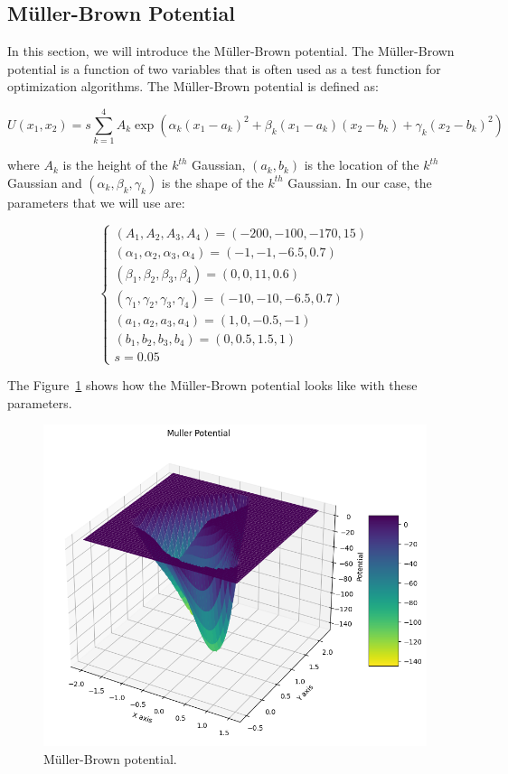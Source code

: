 \documentclass{report}
\begin{document}
\subsection{Müller-Brown Potential}
\label{sec:muller_brown_potential}

In this section, we will introduce the Müller-Brown potential. The Müller-Brown potential is a function of two variables that is often used as a test function for optimization algorithms. The Müller-Brown potential is defined as:

\[
	U(x_1, x_2) = s \sum_{k=1}^4 A_k \exp(\alpha_k(x_1 - a_k)^2 + \beta_k(x_1 - a_k)(x_2 - b_k) + \gamma_k(x_2 - b_k)^2)
\]

where \(A_k\) is the height of the \(k^{th}\) Gaussian, \((a_k, b_k)\) is the location of the \(k^{th}\) Gaussian and \((\alpha_k, \beta_k, \gamma_k)\) is the shape of the \(k^{th}\) Gaussian. In our case, the parameters that we will use are:

\[
	\begin{cases}
		(A_1, A_2, A_3, A_4) = (-200, -100, -170, 15) \\
		(\alpha_1, \alpha_2, \alpha_3, \alpha_4) = (-1, -1, -6.5, 0.7) \\
		(\beta_1, \beta_2, \beta_3, \beta_4) = (0, 0, 11, 0.6) \\
		(\gamma_1, \gamma_2, \gamma_3, \gamma_4) = (-10, -10, -6.5, 0.7) \\
		(a_1, a_2, a_3, a_4) = (1, 0, -0.5, -1) \\
		(b_1, b_2, b_3, b_4) = (0, 0.5, 1.5, 1) \\
		s = 0.05
	\end{cases}
\]

The Figure~\ref{fig:mullerbrown} shows how the Müller-Brown potential looks like with these parameters.

\begin{figure}[H]
	\centering
	\includegraphics[width=0.5\linewidth]{./Figures/MCMC/mullerbrown.png}
	\caption{Müller-Brown potential.}
	\label{fig:mullerbrown}
\end{figure}
\end{document}
